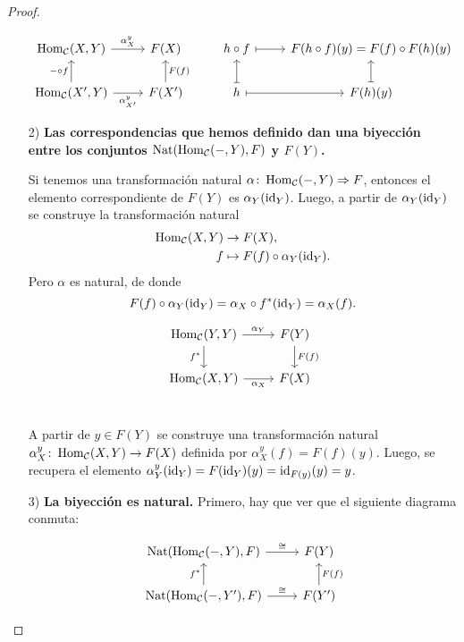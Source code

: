 \documentclass{article}
\numberwithin{equation}{section}
\theoremstyle{definition}
\begin{document}
\begin{proposicion}
\begin{proof}
\begin{enumerate}
      \[ \begin{tikzcd}
          \Hom_\vcateg{C} (X,Y) \ar{r}{\alpha_X^y} & F (X) & h\circ f\ar[|->]{r} & F (h\circ f) (y) = F (f) \circ F (h) (y) \\
          \Hom_\vcateg{C} (X',Y) \ar{r}[swap]{\alpha_{X'}^y}\ar{u}{-\circ f} & F (X')\ar{u}[swap]{F (f)} & h\ar[|->]{u}\ar[|->]{r} & F (h) (y) \ar[|->]{u}
        \end{tikzcd} \]

    \item[2)] \textbf{Las correspondencias que hemos definido dan una biyección
        entre los conjuntos $\operatorname{Nat} (\operatorname{Hom}_\mathcal{C} (-,Y), F)$ y $F (Y)$.}

      Si tenemos una transformación natural
      $\alpha\colon \operatorname{Hom}_\mathcal{C} (-,Y) \Rightarrow F$, entonces el elemento
      correspondiente de $F (Y)$ es $\alpha_Y (\mathrm{id}_{Y})$. Luego, a partir de
      $\alpha_Y (\mathrm{id}_{Y})$ se construye la transformación natural
      \begin{align*}
  \operatorname{Hom}_\mathcal{C} (X,Y) & \to F (X),\\
        f & \mapsto F (f) \circ \alpha_Y (\mathrm{id}_{Y}).
      \end{align*}
      Pero $\alpha$ es natural, de donde
      $$F (f) \circ \alpha_Y (\mathrm{id}_{Y}) = \alpha_X\circ f^* (\mathrm{id}_{Y}) = \alpha_X (f).$$

      \[ \begin{tikzcd}
          \Hom_\vcateg{C} (Y,Y) \ar{r}{\alpha_Y}\ar{d}[swap]{f^*} & F (Y)\ar{d}{F (f)} \\
          \Hom_\vcateg{C} (X,Y) \ar{r}[swap]{\alpha_X} & F (X) \\
\end{tikzcd} \]

A partir de $y\in F (Y)$ se construye una transformación natural
$\alpha^y_X\colon \operatorname{Hom}_\mathcal{C} (X,Y) \to F (X)$ definida por
$\alpha^y_X (f) = F (f) (y)$. Luego, se recupera el elemento
$\alpha^y_Y (\mathrm{id}_{Y}) = F (\mathrm{id}_{Y}) (y) = \mathrm{id}_{F (y)} (y) = y$.

\item[3)] \textbf{La biyección es natural.} Primero, hay que ver que el
  siguiente diagrama conmuta:

  \[ \begin{tikzcd}
      \Nat (\Hom_\vcateg{C} (-,Y), F)\ar{r}{\isom} & F (Y) \\
      \Nat (\Hom_\vcateg{C} (-,Y'), F) \ar{r}{\isom} \ar{u}{f^*} & F (Y')\ar{u}[swap]{F (f)}
    \end{tikzcd} \]


\end{enumerate}
\end{proof}
\end{proposicion}
\end{document}
